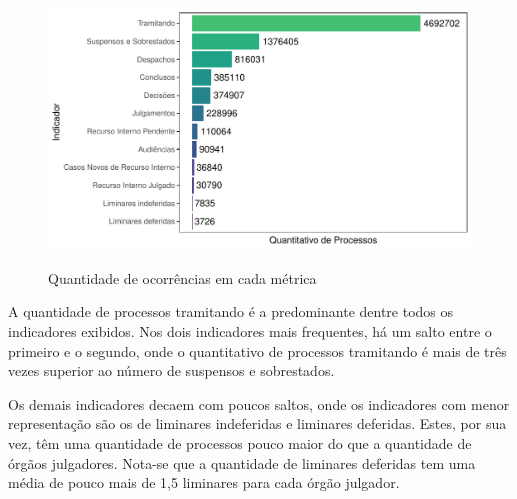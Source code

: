 \begin{figure}[H]
    \centering
    \caption{Quantidade de ocorrências em cada métrica}
    \includegraphics[scale=.9]{imagens/inds_qtd.pdf}
    \label{fig:inds_qtd}
\end{figure}

A quantidade de processos tramitando é a predominante dentre todos os indicadores exibidos. Nos dois indicadores mais frequentes, há um salto entre o primeiro e o segundo, onde o quantitativo de processos tramitando é mais de três vezes superior ao número de suspensos e sobrestados.

Os demais indicadores decaem com poucos saltos, onde os indicadores com menor representação são os de liminares indeferidas e liminares deferidas. Estes, por sua vez, têm uma quantidade de processos pouco maior do que a quantidade de órgãos julgadores. Nota-se que a quantidade de liminares deferidas tem uma média de pouco mais de 1,5 liminares para cada órgão julgador.


